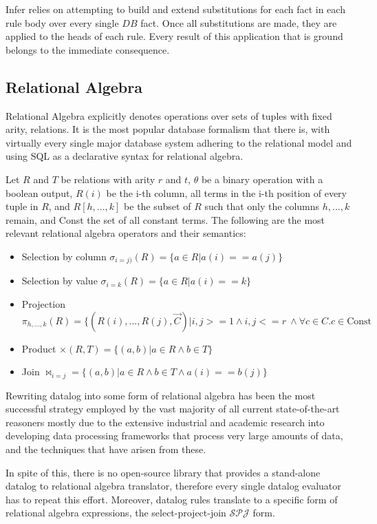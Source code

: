 \documentclass[sigconf,screen,review,natbib]{acmart}
\theoremstyle{definition}
\begin{document}
Infer relies on attempting to build and extend substitutions for each fact in each rule body over every single $DB$ fact. Once
all substitutions are made, they are applied to the heads of each rule. Every result of this application that is ground belongs
to the immediate consequence.

\subsection{Relational Algebra}
Relational Algebra\cite{codd_1970} explicitly denotes operations over sets of tuples with fixed arity, relations. It is
the most popular database formalism that there is, with virtually every single major database system adhering to the relational model\cite{pg,mysql,sqlserver}
and using SQL as a declarative syntax for relational algebra.

Let $R$ and $T$ be relations with arity $r$ and $t$, $\theta$ be a binary operation with a boolean output, $R(i)$ be the i-th column, all terms in the i-th position of every tuple in $R$, and
$R[h, ..., k]$ be the subset of $R$ such that only the columns $h, ..., k$ remain, and Const the set of all constant terms. The following
are the most relevant relational algebra operators and their semantics:
\begin{itemize}
	\item Selection by column $\sigma_{i=j)}(R) = \{ a \in R | a(i) == a(j) \}$
	\item Selection by value $\sigma_{i=k}(R) = \{a \in R | a(i) == k \}$
	\item Projection $\pi_{h, ..., k}(R) = \{(R(i), ..., R(j), \overrightarrow{C}) |  i, j >= 1 \wedge i, j <= r\ \wedge \forall c \in C. c \in \text{Const}$
	\item Product $\times(R, T) = \{(a, b) | a \in R \wedge b \in T \}$
	\item Join $\Join_{i=j} = \{(a, b) | a \in R \wedge b \in T \wedge a(i) == b(j)\}$
\end{itemize}

Rewriting datalog into some form of relational algebra has been the most successful strategy employed by the vast majority of all current state-of-the-art
reasoners\cite{bigdatalog, cog, nexus, recstep, dcdatalog, souffle} mostly due to the extensive industrial and academic research into developing data processing frameworks that
process very large amounts of data, and the techniques that have arisen from these.

In spite of this, there is no open-source library that provides a stand-alone datalog to relational algebra translator, therefore every single
datalog evaluator has to repeat this effort. Moreover, datalog rules translate to a specific form of relational algebra expressions, the
select-project-join $\mathcal{SPJ}$ form.
\end{document}
